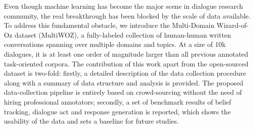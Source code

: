 Even though machine learning has become the major scene in dialogue research community, the real breakthrough has been blocked by the scale of data available. To address this fundamental obstacle, we introduce the Multi-Domain Wizard-of-Oz dataset (MultiWOZ), a fully-labeled collection of human-human written conversations spanning over multiple domains and topics. At a size of 10k dialogues, it is at least one order of magnitude larger than all previous annotated task-oriented corpora. The contribution of this work apart from the open-sourced dataset is two-fold: firstly, a detailed description of the data collection procedure along with a summary of data structure and analysis is provided. The proposed data-collection pipeline is entirely based on crowd-sourcing without the need of hiring professional annotators; secondly, a set of benchmark results of belief tracking, dialogue act and response generation is reported, which shows the usability of the data and sets a baseline for future studies.
